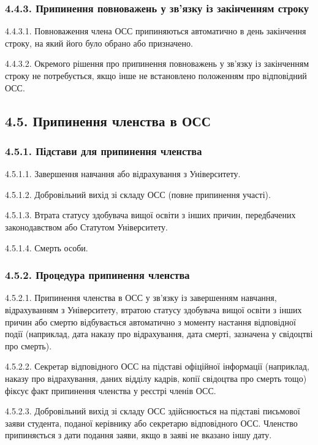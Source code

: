     \subsubsection*{4.4.3. Припинення повноважень у зв'язку із закінченням строку}
        4.4.3.1. Повноваження члена ОСС припиняються автоматично в день закінчення строку, на який його було обрано або призначено.

        4.4.3.2. Окремого рішення про припинення повноважень у зв'язку із закінченням строку не потребується, якщо інше не встановлено положенням про відповідний ОСС.

\subsection*{4.5. Припинення членства в ОСС}
    \subsubsection*{4.5.1. Підстави для припинення членства}
        4.5.1.1. Завершення навчання або відрахування з Університету.

        4.5.1.2. Добровільний вихід зі складу ОСС (повне припинення участі).

        4.5.1.3. Втрата статусу здобувача вищої освіти з інших причин, передбачених законодавством або Статутом Університету.

        4.5.1.4. Смерть особи.

    \subsubsection*{4.5.2. Процедура припинення членства}
        4.5.2.1. Припинення членства в ОСС у зв'язку із завершенням навчання, відрахуванням з Університету, втратою статусу здобувача вищої освіти з інших причин або смертю відбувається автоматично з моменту настання відповідної події (наприклад, дата наказу про відрахування, дата смерті, зазначена у свідоцтві про смерть).

        4.5.2.2. Секретар відповідного ОСС на підставі офіційної інформації (наприклад, наказу про відрахування, даних відділу кадрів, копії свідоцтва про смерть тощо) фіксує факт припинення членства у реєстрі членів ОСС.

        4.5.2.3. Добровільний вихід зі складу ОСС здійснюється на підставі письмової заяви студента, поданої керівнику або секретарю відповідного ОСС. Членство припиняється з дати подання заяви, якщо в заяві не вказано іншу дату.

